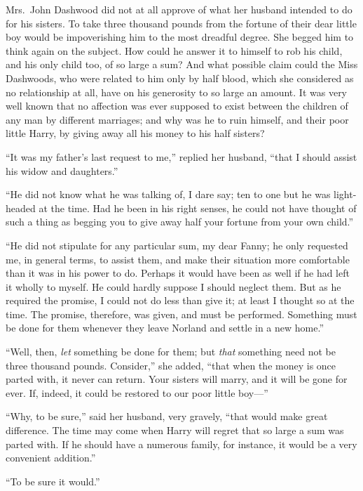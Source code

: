 Mrs.\ John Dashwood did not at all approve of what her
husband intended to do for his sisters.  To take three
thousand pounds from the fortune of their dear little boy
would be impoverishing him to the most dreadful degree.
She begged him to think again on the subject.  How could
he answer it to himself to rob his child, and his only
child too, of so large a sum?  And what possible claim
could the Miss Dashwoods, who were related to him only by
half blood, which she considered as no relationship at all,
have on his generosity to so large an amount.  It was very
well known that no affection was ever supposed to exist
between the children of any man by different marriages;
and why was he to ruin himself, and their poor little Harry,
by giving away all his money to his half sisters?

``It was my father's last request to me,'' replied
her husband, ``that I should assist his widow and daughters.''

``He did not know what he was talking of, I dare say;
ten to one but he was light-headed at the time.
Had he been in his right senses, he could not have thought
of such a thing as begging you to give away half your
fortune from your own child.''

``He did not stipulate for any particular sum,
my dear Fanny; he only requested me, in general terms,
to assist them, and make their situation more comfortable
than it was in his power to do.  Perhaps it would
have been as well if he had left it wholly to myself.
He could hardly suppose I should neglect them.
But as he required the promise, I could not do less
than give it; at least I thought so at the time.
The promise, therefore, was given, and must be performed.
Something must be done for them whenever they leave Norland
and settle in a new home.''

``Well, then, \emph{let} something be done for them;
but \emph{that} something need not be three thousand pounds.
Consider,'' she added, ``that when the money is once
parted with, it never can return.  Your sisters will marry,
and it will be gone for ever.  If, indeed, it could
be restored to our poor little boy---''

``Why, to be sure,'' said her husband, very gravely,
``that would make great difference.  The time may come when
Harry will regret that so large a sum was parted with.
If he should have a numerous family, for instance, it would
be a very convenient addition.''

``To be sure it would.''

